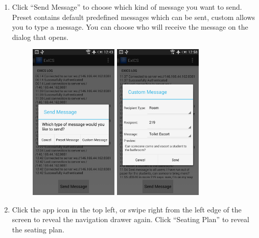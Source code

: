 \begin{enumerate}
\item Click ``Send Message'' to choose which kind of message you want to send.  Preset contains default predefined messages which can be sent, custom allows you to type a message.  You can choose who will receive the message on the dialog that opens.

\begin{figure}[!htbp]
	\centering
	\includegraphics[width=0.4\textwidth]{"screenshots/User guide/10"}
	\includegraphics[width=0.4\textwidth]{"screenshots/User guide/10_5"}
\end{figure}

\FloatBarrier
\clearpage
\FloatBarrier

\item Click the app icon in the top left, or swipe right from the left edge of the screen to reveal the navigation drawer again.  Click ``Seating Plan'' to reveal the seating plan.


\end{enumerate}
